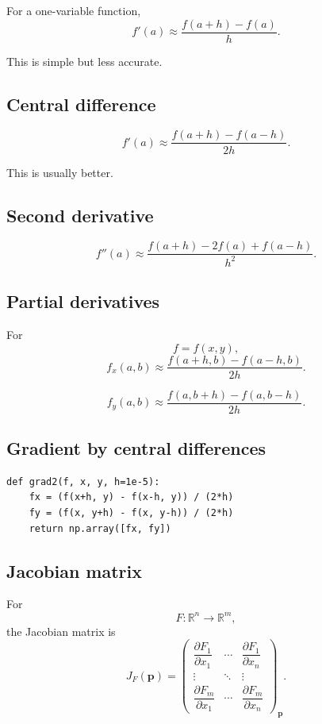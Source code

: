 For a one-variable function,
\[
\boxed{
    f'(a)\approx \frac{f(a+h)-f(a)}{h}.
}
\]

This is simple but less accurate.

\subsection*{Central difference}

\[
\boxed{
    f'(a)\approx
    \frac{f(a+h)-f(a-h)}{2h}.
}
\]

This is usually better.

\subsection*{Second derivative}

\[
\boxed{
    f''(a)\approx
    \frac{f(a+h)-2f(a)+f(a-h)}{h^2}.
}
\]

\subsection*{Partial derivatives}

For
\[
    f=f(x,y),
\]
\[
\boxed{
    f_x(a,b)
    \approx
    \frac{f(a+h,b)-f(a-h,b)}{2h}.
}
\]

\[
\boxed{
    f_y(a,b)
    \approx
    \frac{f(a,b+h)-f(a,b-h)}{2h}.
}
\]

\subsection*{Gradient by central differences}

\begin{verbatim}
def grad2(f, x, y, h=1e-5):
    fx = (f(x+h, y) - f(x-h, y)) / (2*h)
    fy = (f(x, y+h) - f(x, y-h)) / (2*h)
    return np.array([fx, fy])
\end{verbatim}

\subsection*{Jacobian matrix}

For
\[
    F:\mathbb R^n\to\mathbb R^m,
\]
the Jacobian matrix is
\[
\boxed{
    J_F(\mathbf p)
    =
    \begin{pmatrix}
    \dfrac{\partial F_1}{\partial x_1} & \cdots & \dfrac{\partial F_1}{\partial x_n}\\[2mm]
    \vdots & \ddots & \vdots\\[2mm]
    \dfrac{\partial F_m}{\partial x_1} & \cdots & \dfrac{\partial F_m}{\partial x_n}
    \end{pmatrix}_{\mathbf p}.
}
\]

